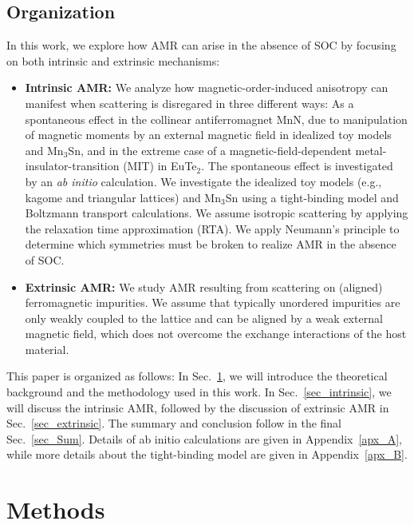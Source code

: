 \documentclass[prb,showpacs,amsmath,amssymb,superscriptaddress,twocolumn,floatfix]{revtex4-1}
\begin{document}
\subsection{Organization}

In this work, we explore how AMR can arise in the absence of SOC by focusing on both intrinsic and extrinsic mechanisms: 


\begin{itemize}
	\item \textbf{Intrinsic AMR:} We analyze how magnetic-order-induced anisotropy can manifest when scattering is disregared in three different ways: As a spontaneous effect in the collinear antiferromagnet MnN, due to manipulation of magnetic moments by an external magnetic field in idealized toy models and Mn$_3$Sn, and in the extreme case of a magnetic-field-dependent metal-insulator-transition (MIT) in EuTe$_2$. The spontaneous effect is investigated by an \textit{ab initio} calculation. We investigate the idealized toy models (e.g., kagome and triangular lattices) and Mn$_3$Sn using a tight-binding model and Boltzmann transport calculations. We assume isotropic scattering by applying the relaxation time approximation (RTA). We apply Neumann’s principle to determine which symmetries must be broken to realize AMR in the absence of SOC.
	
	\item \textbf{Extrinsic AMR:} We study AMR resulting from scattering on (aligned) ferromagnetic impurities. We assume that typically unordered impurities are only weakly coupled to the lattice and can be aligned by a weak external magnetic field, which does not overcome the exchange interactions of the host material.	
\end{itemize}
 

This paper is organized as follows: In Sec.~\ref{sec_modelling}, we
will introduce the theoretical background and the methodology used in this work. In Sec.~\ref{sec_intrinsic}, we will discuss the intrinsic AMR, followed by the discussion of extrinsic AMR in Sec.~\ref{sec_extrinsic}. The summary and conclusion follow in the final Sec.~\ref{sec_Sum}. Details of ab initio calculations are given in Appendix~\ref{apx_A}, while more details about the tight-binding model are given in Appendix~\ref{apx_B}.

\section{Methods}
\label{sec_modelling}
\end{document}
